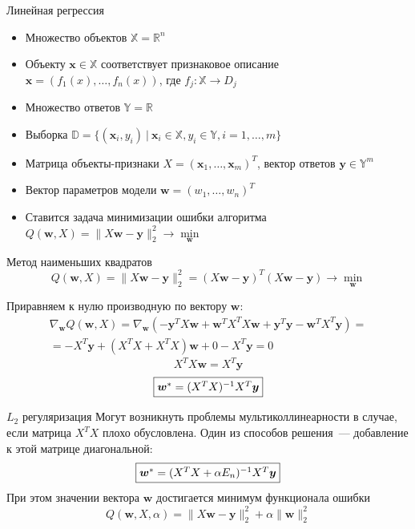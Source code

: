 \documentclass{beamer} %
\newcommand{\R}{\mathbb{R}}
\newcommand{\norm}[1]{\lVert #1 \rVert_2}
\begin{document}
    \begin{frame}{Линейная регрессия}
        \begin{itemize}
            \item Множество объектов $\mathds{X} = \R^n$
            \item Объекту $\bm{x} \in \mathds{X}$ соответствует признаковое описание $\bm{x} = (f_1(x), \ldots, f_n(x))$,
            где $f_j: \mathds{X} \to D_j$ 
            \item Множество ответов $\mathds{Y} = \R$
            \item Выборка $\mathds{D} = \{ (\bm{x}_i, y_i) \ | \ \bm{x}_i \in \mathds{X}, y_i \in \mathds{Y}, i = 1, \ldots, m \}$
            \item Матрица объекты-признаки $X = (\bm{x}_1, \ldots, \bm{x}_m)^T$, вектор ответов $\bm{y} \in \mathds{Y}^m$
            \item Вектор параметров модели $\bm{w} = (w_1, \ldots, w_n)^T$
            \item Ставится задача минимизации ошибки алгоритма $Q(\bm{w}, X) = \lVert X \bm{w} - \bm{y} \rVert_2^2 \to \min\limits_{\bm{w}}$
        \end{itemize}
    \end{frame}

    \begin{frame}{Метод наименьших квадратов}
        \[ Q(\bm{w}, X) = \lVert X \bm{w} - \bm{y} \rVert_2^2 = (X \bm{w} - \bm{y})^T (X \bm{w} - \bm{y}) \to \min\limits_{\bm{w}} \]

        Приравняем к нулю производную по вектору $\bm{w}$:
        \begin{multline*}
            \nabla_{\bm{w}} Q(\bm{w}, X) = \nabla_{\bm{w}}(-\bm{y}^T X \bm{w} + \bm{w}^T X^T X \bm{w} + \bm{y}^T \bm{y} - \bm{w}^T X^T \bm{y}) = \\ 
            = - X^T \bm{y} + (X^T X + X^T X) \bm{w} + 0 - X^T \bm{y} = 0
        \end{multline*}
        \[ X^T X \bm{w} = X^T \bm{y} \]
        \[ \fbox{$\bm{w}^* = (X^T X)^{-1} X^T \bm{y}$} \]

    \end{frame}

    \begin{frame}{$L_2$ регуляризация}
        Могут возникнуть проблемы мультиколлинеарности в случае, если матрица $X^T X$ плохо обусловлена.
        Один из способов решения~--- добавление к этой матрице диагональной:
        \[ \fbox{$\bm{w}^* = (X^T X + \alpha E_n)^{-1} X^T \bm{y}$} \]
        При этом значении вектора $\bm{w}$ достигается минимум функционала ошибки
        \[ Q(\bm{w}, X, \alpha) = \norm{X \bm{w} - \bm{y}}^2 + \alpha \lVert \bm{w} \rVert_2^2 \]
    \end{frame}
\end{document}
